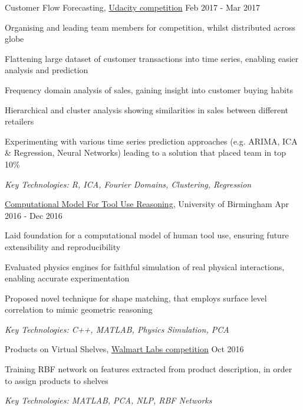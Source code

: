 \documentclass[11pt,article,oneside]{memoir}
\newenvironment{itemize*}{%
  \renewcommand\labelitemi{\textbullet}
  \footnotesize
  \begin{itemize}%
    \setlength{\itemsep}{0pt}}%
  {\end{itemize}
}
\begin{document}
\normalsize
\medskip
\ind Customer Flow Forecasting, \href{https://blog.udacity.com/2017/01/data-science-enthusiasts-win-10000.html}{Udacity competition} \hfill Feb 2017 - Mar 2017
\begin{itemize*}
  \item Organising and leading team members for competition, whilst distributed across globe
  \item Flattening large dataset of customer transactions into time series, enabling easier analysis and prediction  
  \item Frequency domain analysis of sales, gaining insight into customer buying habits
  \item Hierarchical and cluster analysis showing similarities in sales between different retailers 
  \item Experimenting with various time series prediction approaches (e.g. ARIMA, ICA \& Regression, Neural Networks) leading to a solution that placed team in top 10\%
\end{itemize*}
\ind \hspace{0.35in} \footnotesize \emph{Key Technologies: R, ICA, Fourier Domains, Clustering, Regression}

\normalsize
\medskip
\ind \href{https://github.com/iceiony/4ConstraintsTheory/}{Computational Model For Tool Use Reasoning}, University of Birmingham \hfill Apr 2016 - Dec 2016
\begin{itemize*}
  \item Laid foundation for a computational model of human tool use, ensuring future extensibility and reproducibility 
  \item Evaluated physics engines for faithful simulation of real physical interactions, enabling accurate experimentation 
  \item Proposed novel technique for shape matching, that employs surface level correlation to mimic geometric reasoning
\end{itemize*}
\ind \hspace{0.35in} \footnotesize \emph{Key Technologies: C++, MATLAB, Physics Simulation, PCA}

\normalsize
\medskip
\ind Products on Virtual Shelves, \href{https://www.hackerrank.com/walmart-codesprint-ml}{Walmart Labs competition} \hfill Oct 2016
\begin{itemize*}
  \item Training RBF network on features extracted from product description, in order to assign products to shelves
\end{itemize*}
\ind \hspace{0.35in} \footnotesize \emph{Key Technologies: MATLAB, PCA, NLP, RBF Networks}
\end{document}
